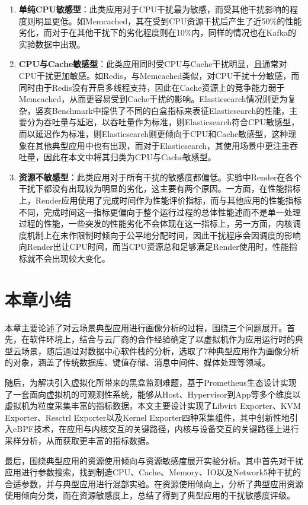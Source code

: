 \begin{enumerate}
    \item \textbf{单纯CPU敏感型}：此类应用对于CPU干扰最为敏感，而受其他干扰影响的程度则明显更低。如Memcached，其在受到CPU资源干扰后产生了近50\%的性能劣化，而对于在其他干扰下的劣化程度则在10\%内，同样的情况也在Kafka的实验数据中出现。
    \item \textbf{CPU与Cache敏感型}：此类应用同时受CPU与Cache干扰明显，且通常对CPU干扰更加敏感。如Redis，与Memcached类似，对CPU干扰十分敏感，而同时由于Redis没有开启多线程支持，因此在Cache资源上的竞争能力弱于Memcached，从而更容易受到Cache干扰的影响。Elasticsearch情况则更为复杂，竖亥Benchmark中提供了不同的白盒指标来表征Elasticsearch的性能，主要分为吞吐量与延迟，以吞吐量作为标准，则Elasticsearch符合CPU敏感型，而以延迟作为标准，则Elasticsearch则更倾向于CPU和Cache敏感型，这种现象在其他典型应用中也有出现，而对于Elasticsearch，其使用场景中更注重吞吐量，因此在本文中将其归类为CPU与Cache敏感型。
    \item \textbf{资源不敏感型}：此类应用对于所有干扰的敏感度都偏低。实验中Render在各个干扰下都没有出现较为明显的劣化，这主要有两个原因。一方面，在性能指标上，Render应用使用了完成时间作为性能评价指标，而与其他应用的性能指标不同，完成时间这一指标更偏向于整个运行过程的总体性能述而不是单一处理过程的性能，一些突发的性能劣化不会体现在这一指标上，另一方面，内核调度机制上在未作限制时倾向于公平地分配时间，因此干扰程序会因调度的影响向Render出让CPU时间，而当CPU资源总和足够满足Render使用时，性能指标就不会出现较大变化。
\end{enumerate}

\section{本章小结}

本章主要论述了对云场景典型应用进行画像分析的过程，围绕三个问题展开。首先，在软件环境上，结合与云厂商的合作经验确定了以虚拟机作为应用运行时的典型云场景，随后通过对数据中心软件栈的分析，选取了7种典型应用作为画像分析的对象，涵盖了传统数据库、键值存储、消息中间件、媒体处理等领域。

随后，为解决引入虚拟化所带来的黑盒监测难题，基于Prometheus生态设计实现了一套面向虚拟机的可观测性系统，能够从Host、Hypervisor到App等多个维度以虚拟机为粒度采集丰富的指标数据，本文主要设计实现了Libvirt Exporter、KVM Exporter、Resctrl Exporter以及Kernel Exporter四种采集组件，其中创新性地引入eBPF技术，在应用与内核交互的关键路径，内核与设备交互的关键路径上进行采样分析，从而获取更丰富的指标数据。

最后，围绕典型应用的资源使用倾向与资源敏感度展开实验分析。其中首先对干扰应用进行参数搜索，找到制造CPU、Cache、Memory、IO以及Network5种干扰的合适参数，并与典型应用进行混部实验。在资源使用倾向上，分析了典型应用资源使用倾向分类，而在资源敏感度上，总结了得到了典型应用的干扰敏感度评级。
